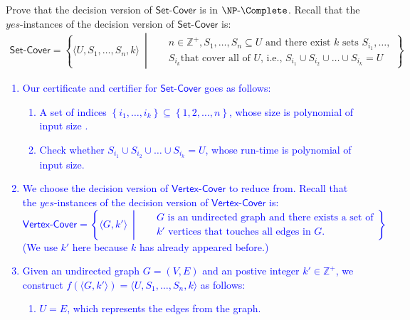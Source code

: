Prove that the decision version of $\mathsf{Set\text{-}Cover}$ is in $\NP \text{-} \Complete$. Recall that the $yes$-instances of the decision version of $\mathsf{Set\text{-}Cover}$ is:
\begin{align*}
\mathsf{Set\text{-}Cover}= \left\{\langle{U, S_1, \ldots, S_n, k \rangle}~\middle|~~~
 \begin{aligned}
     &n \in \mathbb{Z}^+, S_1, \ldots, S_n \subseteq U \text{ and there exist $k$ sets } S_{i_1}, \ldots, \\& S_{i_k} 
     \text{that cover all of $U$, i.e., }
     S_{i_1} \cup S_{i_2} \cup \dots \cup S_{i_k} = U
 \end{aligned}
\right\}
\end{align*}
\textcolor{blue}{
  \begin{enumerate}
    \item Our certificate and certifier for $\mathsf{Set\text{-}Cover}$ goes as follows:
    \begin{enumerate}
        \item A set of indices $\left\{i_1, \dots, i_k\right\} \subseteq \left\{1, 2, \dots, n\right\}$, whose size is polynomial of input size .
        \item Check whether $S_{i_1} \cup S_{i_2} \cup \dots \cup S_{i_k} = U$, whose run-time is polynomial of input size.
    \end{enumerate}
    \item We choose the decision version of $\mathsf{Vertex\text{-}Cover}$ to reduce from. Recall that the $yes$-instances of the decision version of $\mathsf{Vertex\text{-}Cover}$ is:
    \begin{equation*}
        \mathsf{Vertex\text{-}Cover} = \left\{\langle{G,k'\rangle}~\middle|~~~
    \begin{aligned}
        &\text{$G$ is an undirected graph and there exists a set of} \\&\text{$k'$ vertices that touches all edges in $G$.}
    \end{aligned}\right\}
    \end{equation*}
    (We use $k'$ here because $k$ has already appeared before.)
    \item Given an undirected graph $G = (V, E)$ and an postive integer $k' \in \mathbb{Z}^+$, we construct $f\left( \langle G, k'\rangle \right) = \langle{U, S_1, \ldots, S_n, k \rangle}$ as follows:
    \begin{enumerate}
        \item $U = E$, which represents the edges from the graph.

\end{enumerate}
\end{enumerate}}
